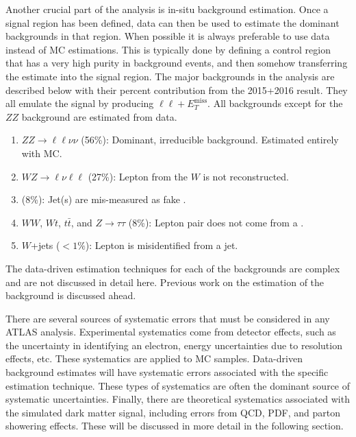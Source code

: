 Another crucial part of the analysis is in-situ background estimation. Once a signal region has been defined, data can then be used to estimate the dominant backgrounds in that region. When possible it is always preferable to use data instead of MC estimations. This is typically done by defining a control region that has a very high purity in background events, and then somehow transferring the estimate into the signal region. The major backgrounds in the analysis are described below with their percent contribution from the 2015+2016 result. They all emulate the signal by producing $\ell\ell+E_{T}^\text{miss}$. All backgrounds except for the $ZZ$ background are estimated from data.
\begin{enumerate}
	\item	 $ZZ \rightarrow \ell \ell \nu \nu$ (56\%): Dominant, irreducible background. Estimated entirely with MC. 
	\item	 $WZ \rightarrow \ell \nu \ell \ell$ (27\%): Lepton from the $W$ is not reconstructed. 
	\item \Zjets (8\%): Jet(s) are mis-measured as fake \etmiss. 
	\item $WW$, $Wt$, $t\bar{t}$, and $Z\rightarrow \tau \tau$ (8\%): Lepton pair does not come from a \Z.
	\item $W$+jets ($<1\%$): Lepton is misidentified from a jet.
\end{enumerate}

\noindent The data-driven estimation techniques for each of the backgrounds are complex and are not discussed in detail here. Previous work on the estimation of the \Zjets background is discussed ahead.

There are several sources of systematic errors that must be considered in any ATLAS analysis. Experimental systematics come from detector effects, such as the uncertainty in identifying an electron, energy uncertainties due to resolution effects, etc. These systematics are applied to MC samples. Data-driven background estimates will have systematic errors associated with the specific estimation technique. These types of systematics are often the dominant source of systematic uncertainties. Finally, there are theoretical systematics associated with the simulated dark matter signal, including errors from QCD, PDF, and parton showering effects. These will be discussed in more detail in the following section.

